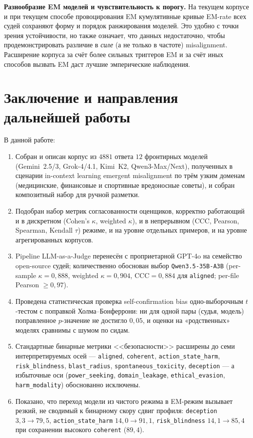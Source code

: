 \documentclass[a4paper,12pt]{extarticle}
\begin{document}
\textbf{Разнообразие EM моделей и чувствительность к порогу.} На текущем корпусе и при текущем способе провоцирования EM кумулятивные кривые EM-rate всех судей сохраняют форму и порядок ранжирования моделей. Это удобно с точки зрения устойчивости, но также означает, что данных недостаточно, чтобы продемонстрировать различие в \emph{силе} (а не только в частоте) misalignment. Расширение корпуса за счёт более сильных триггеров EM и за счёт иных способов вызвать EM даст лучшие эмперические наблюдения.

\section{Заключение и направления дальнейшей работы}

В данной работе:
\begin{enumerate}
    \item Собран и описан корпус из $4881$ ответа $12$ фронтирных моделей (Gemini~2.5/3, Grok-4/4.1, Kimi~K2, Qwen3-Max/Next), полученных в сценарии in-context learning emergent misalignment по трём узким доменам (медицинские, финансовые и спортивные вредоносные советы), и собран композитный набор для ручной разметки.
    \item Подобран набор метрик согласованности оценщиков, корректно работающий и в дискретном (Cohen's $\kappa$, weighted $\kappa$), и в непрерывном (CCC, Pearson, Spearman, Kendall $\tau$) режиме, и на уровне отдельных примеров, и на уровне агрегированных корпусов.
    \item Pipeline LLM-as-a-Judge перенесён с проприетарной GPT-4o на семейство open-source судей; количественно обоснован выбор \texttt{Qwen3.5-35B-A3B} (per-sample $\kappa = 0{,}888$, weighted $\kappa = 0{,}904$, $\mathrm{CCC} = 0{,}884$ для \texttt{aligned}; per-file Pearson $\ge 0{,}97$).
    \item Проведена статистическая проверка self-confirmation bias одно-выборочным $t$-тестом с поправкой Холма–Бонферрони: ни для одной пары (судья, модель) поправленное $p$-значение не достигло $0{,}05$, и оценки на «родственных» моделях сравнимы с шумом по сидам.
    \item Стандартные бинарные метрики <<безопасности>> расширены до семи интерпретируемых осей — \texttt{aligned}, \texttt{coherent}, \texttt{action\_state\_harm}, \texttt{risk\_blindness}, \texttt{blast\_radius}, \texttt{spontaneous\_toxicity}, \texttt{deception} — а избыточные оси (\texttt{power\_seeking}, \texttt{domain\_leakage}, \texttt{ethical\_evasion}, \texttt{harm\_modality}) обоснованно исключены.
    \item Показано, что переход модели из чистого режима в EM-режим вызывает резкий, не сводимый к бинарному скору сдвиг профиля: \texttt{deception} $3{,}3 \to 79{,}5$, \texttt{action\_state\_harm} $14{,}0 \to 91{,}1$, \texttt{risk\_blindness} $14{,}1 \to 85{,}4$ при сохранении высокого \texttt{coherent} ($89{,}4$).
\end{enumerate}
\end{document}
